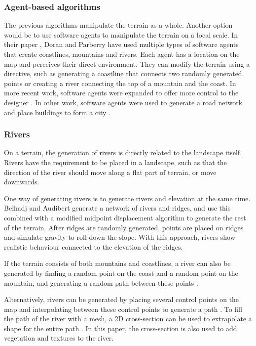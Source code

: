 \subsubsection{Agent-based algorithms}
The previous algorithms manipulate the terrain as a whole. Another option would be to use software agents to manipulate the terrain on a local scale. In their paper \cite{doran_controlled_2010}, Doran and Parberry have used multiple types of software agents that create coastlines, mountains and rivers. Each agent has a location on the map and perceives their direct environment. They can modify the terrain using a directive, such as generating a coastline that connects two randomly generated points or creating a river connecting the top of a mountain and the coast. In more recent work, software agents were expanded to offer more control to the designer \cite{skold_generating_2023}. In other work, software agents were used to generate a road network and place buildings to form a city \cite{lechner_procedural_2003}.

\subsubsection{Rivers}
On a terrain, the generation of rivers is directly related to the landscape itself. Rivers have the requirement to be placed in a landscape, such as that the direction of the river should move along a flat part of terrain, or move downwards.

One way of generating rivers is to generate rivers and elevation at the same time. Belhadj and Audibert \cite{belhadj_modeling_2005} generate a network of rivers and ridges, and use this combined with a modified midpoint displacement algorithm to generate the rest of the terrain. After ridges are randomly generated, points are placed on ridges and simulate gravity to roll down the slope. With this approach, rivers show realistic behaviour connected to the elevation of the ridges.

If the terrain consists of both mountains and coastlines, a river can also be generated by finding a random point on the coast and a random point on the mountain, and generating a random path between these points \cite{doran_controlled_2010} \cite{prusinkiewicz_fractal_1993}.

Alternatively, rivers can be generated by placing several control points on the map and interpolating between these control points to generate a path \cite{smelik_declarative_2011}. To fill the path of the river with a mesh, a 2D cross-section can be used to extrapolate a shape for the entire path \cite{huijser_procedural_2010}. In this paper, the cross-section is also used to add vegetation and textures to the river.

